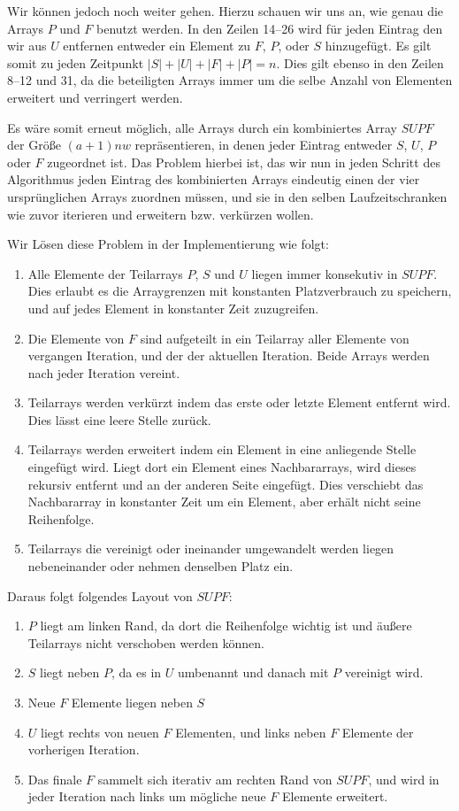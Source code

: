 Wir können jedoch noch weiter gehen. Hierzu schauen wir uns an, wie genau die Arrays $P$ und $F$ benutzt werden. In den Zeilen 14--26 wird für jeden Eintrag den wir aus $U$ entfernen entweder ein Element zu $F$, $P$, oder $S$ hinzugefügt. Es gilt somit zu jeden Zeitpunkt $|S| + |U| + |F| + |P| = n$. Dies gilt ebenso in den Zeilen 8--12 und 31, da die beteiligten Arrays immer um die selbe Anzahl von Elementen erweitert und verringert werden.

Es wäre somit erneut möglich, alle Arrays durch ein kombiniertes Array $SUPF$ der Größe $(a + 1)nw$ repräsentieren, in denen jeder Eintrag entweder $S$, $U$, $P$ oder $F$ zugeordnet ist. Das Problem hierbei ist, das wir nun in jeden Schritt des Algorithmus jeden Eintrag des kombinierten Arrays eindeutig einen der vier ursprünglichen Arrays zuordnen müssen, und sie in den selben Laufzeitschranken wie zuvor iterieren und erweitern bzw. verkürzen wollen.

Wir Lösen diese Problem in der Implementierung wie folgt:

\begin{enumerate}
\item Alle Elemente der Teilarrays $P$, $S$ und $U$ liegen immer konsekutiv in $SUPF$. Dies erlaubt es die Arraygrenzen mit konstanten Platzverbrauch zu speichern, und auf jedes Element in konstanter Zeit zuzugreifen.
\item Die Elemente von $F$ sind aufgeteilt in ein Teilarray aller Elemente von vergangen Iteration, und der der aktuellen Iteration. Beide Arrays werden nach jeder Iteration vereint.
\item Teilarrays werden verkürzt indem das erste oder letzte Element entfernt wird. Dies lässt eine leere Stelle zurück.
\item Teilarrays werden erweitert indem ein Element in eine anliegende Stelle eingefügt wird. Liegt dort ein Element eines Nachbararrays, wird dieses rekursiv entfernt und an der anderen Seite eingefügt. Dies verschiebt das Nachbararray in konstanter Zeit um ein Element, aber erhält nicht seine Reihenfolge.
\item Teilarrays die vereinigt oder ineinander umgewandelt werden liegen nebeneinander oder nehmen denselben Platz ein.
\end{enumerate}

Daraus folgt folgendes Layout von $SUPF$:

\begin{enumerate}
\item $P$ liegt am linken Rand, da dort die Reihenfolge wichtig ist und äußere Teilarrays nicht verschoben werden können.
\item $S$ liegt neben $P$, da es in $U$ umbenannt und danach mit $P$ vereinigt wird.
\item Neue $F$ Elemente liegen neben $S$
\item $U$ liegt rechts von neuen $F$ Elementen, und links neben $F$ Elemente der vorherigen Iteration.
\item Das finale $F$ sammelt sich iterativ am rechten Rand von $SUPF$, und wird in jeder Iteration nach links um mögliche neue $F$ Elemente erweitert.
\end{enumerate}

